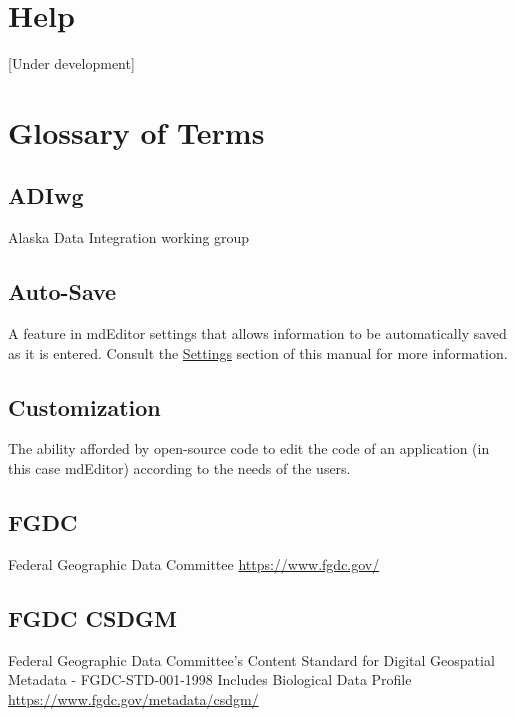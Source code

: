 \documentclass[
]{book}
\begin{document}
\hypertarget{help}{%
\chapter{Help}\label{help}}

{[}Under development{]}

\hypertarget{glossary}{%
\chapter{Glossary of Terms}\label{glossary}}

\hypertarget{adiwg}{%
\section{ADIwg}\label{adiwg}}

Alaska Data Integration working group

\hypertarget{auto-save}{%
\section{Auto-Save}\label{auto-save}}

A feature in mdEditor settings that allows information to be automatically saved as it is entered. Consult the \protect\hyperlink{settings}{Settings} section of this manual for more information.

\hypertarget{customization}{%
\section{Customization}\label{customization}}

The ability afforded by open-source code to edit the code of an application (in this case mdEditor) according to the needs of the users.

\hypertarget{fgdc}{%
\section{FGDC}\label{fgdc}}

Federal Geographic Data Committee \url{https://www.fgdc.gov/}

\hypertarget{fgdc-csdgm}{%
\section{FGDC CSDGM}\label{fgdc-csdgm}}

Federal Geographic Data Committee's Content Standard for Digital Geospatial Metadata - FGDC-STD-001-1998 Includes Biological Data Profile \url{https://www.fgdc.gov/metadata/csdgm/}
\end{document}
